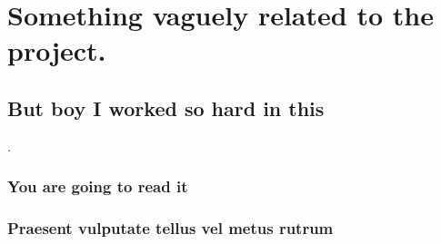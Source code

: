 % 
% 
% 




\chapter{Something vaguely related to the project.}


\section{But boy I worked so hard in this}


\lipsum[70] \cite{europa_rohs, europa_ce}.


\subsection{You are going to read it}

\lipsum[71-72] 


\subsection{Praesent vulputate tellus vel metus rutrum}

\lipsum[73-75]  \cite{ds-sx1276, ds-sx1302, an1368-analog-ferrite}

